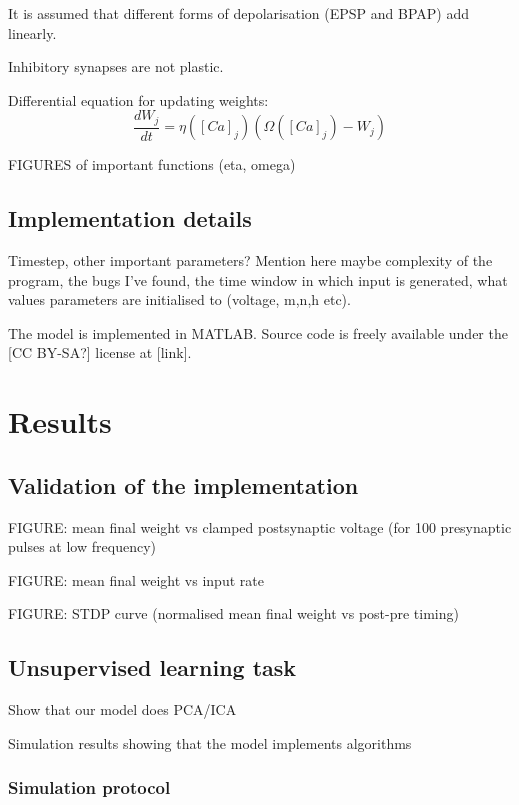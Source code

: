\documentclass[a4paper,12pt]{report}
\theoremstyle{definition}
\begin{document}
It is assumed that different forms of depolarisation (EPSP and BPAP) add linearly. 

Inhibitory synapses are not plastic.

Differential equation for updating weights: $$ \frac{dW_j}{dt} = \eta ([Ca]_j) (\Omega([Ca]_j) - W_j)$$

FIGURES of important functions (eta, omega)




\section{Implementation details}

Timestep, other important parameters? Mention here maybe complexity of the program, the bugs I've found, the time window in which input is generated, what values parameters are initialised to (voltage, m,n,h etc).

The model is implemented in MATLAB. Source code is freely available under the [CC BY-SA?] license at [link].


\chapter{Results}
\section{Validation of the implementation}

FIGURE: mean final weight vs clamped postsynaptic voltage (for 100 presynaptic pulses at low frequency)

FIGURE: mean final weight vs input rate

FIGURE: STDP curve (normalised mean final weight vs post-pre timing)


\section{Unsupervised learning task}
Show that our model does PCA/ICA

Simulation results showing that the model implements algorithms

\subsection{Simulation protocol}
\end{document}
